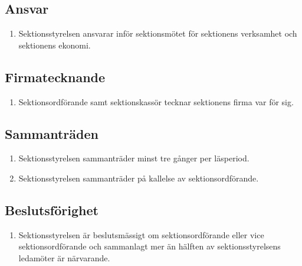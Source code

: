 \documentclass[11pt,a4paper]{article}
\begin{document}
\subsection{Ansvar}

\begin{enumerate}[\thesubsection.1]

  \item Sektionsstyrelsen ansvarar inför sektionsmötet för sektionens verksamhet och sektionens ekonomi.

\end{enumerate}

\subsection{Firmatecknande}

\begin{enumerate}[\thesubsection.1]

  \item Sektionsordförande samt sektionskassör tecknar sektionens
  firma var för sig.

\end{enumerate}

\subsection{Sammanträden}

\begin{enumerate}[\thesubsection.1]

  \item  Sektionsstyrelsen sammanträder minst tre gånger per läsperiod.

  \item Sektionsstyrelsen sammanträder på kallelse av sektionsordförande.

\end{enumerate}

\subsection{Beslutsförighet}

\begin{enumerate}[\thesubsection.1]

  \item  Sektionsstyrelsen är beslutsmässigt om sektionsordförande eller vice sektionsordförande och sammanlagt mer än hälften av sektionsstyrelsens ledamöter är närvarande.

\end{enumerate}
\end{document}
